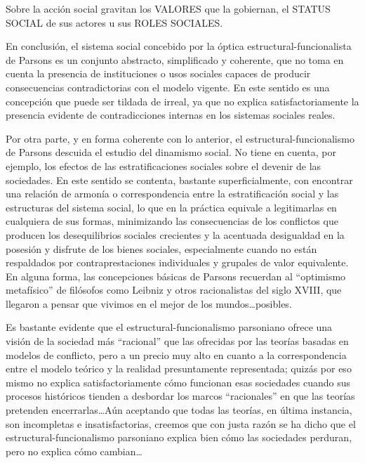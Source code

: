 \documentclass[
]{book}
\begin{document}
Sobre la acción social gravitan los VALORES que la gobiernan, el STATUS SOCIAL de sus actores u sus ROLES SOCIALES.

En conclusión, el sistema social concebido por la óptica estructural-funcionalista de Parsons es un conjunto abstracto, simplificado y coherente, que no toma en cuenta la presencia de instituciones o usos sociales capaces de producir consecuencias contradictorias con el modelo vigente. En este sentido es una concepción que puede ser tildada de irreal, ya que no explica satisfactoriamente la presencia evidente de contradicciones internas en los sistemas sociales reales.

Por otra parte, y en forma coherente con lo anterior, el estructural-funcionalismo de Parsons descuida el estudio del dinamismo social. No tiene en cuenta, por ejemplo, los efectos de las estratificaciones sociales sobre el devenir de las sociedades. En este sentido se contenta, bastante superficialmente, con encontrar una relación de armonía o correspondencia entre la estratificación social y las estructuras del sistema social, lo que en la práctica equivale a legitimarlas en cualquiera de sus formas, minimizando las consecuencias de los conflictos que producen los desequilibrios sociales crecientes y la acentuada desigualdad en la posesión y disfrute de los bienes sociales, especialmente cuando no están respaldados por contraprestaciones individuales y grupales de valor equivalente. En alguna forma, las concepciones básicas de Parsons recuerdan al ``optimismo metafísico'' de filósofos como Leibniz y otros racionalistas del siglo XVIII, que llegaron a pensar que vivimos en el mejor de los mundos\ldots posibles.

Es bastante evidente que el estructural-funcionalismo parsoniano ofrece una visión de la sociedad más ``racional'' que las ofrecidas por las teorías basadas en modelos de conflicto, pero a un precio muy alto en cuanto a la correspondencia entre el modelo teórico y la realidad presuntamente representada; quizás por eso mismo no explica satisfactoriamente cómo funcionan esas sociedades cuando sus procesos históricos tienden a desbordar los marcos ``racionales'' en que las teorías pretenden encerrarlas\ldots Aún aceptando que todas las teorías, en última instancia, son incompletas e insatisfactorias, creemos que con justa razón se ha dicho que el estructural-funcionalismo parsoniano explica bien cómo las sociedades perduran, pero no explica cómo cambian\ldots{}
\end{document}
